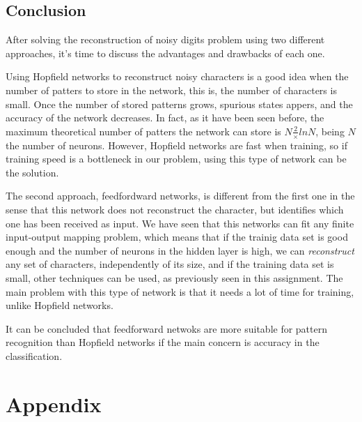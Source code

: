 \documentclass[10pt]{article}
\begin{document}
\begin{multicols}{2}
  \section*{Conclusion}
  After solving the reconstruction of noisy digits problem using two different approaches,
  it's time to discuss the advantages and drawbacks of each one.

  Using Hopfield networks to reconstruct noisy characters is a good idea when the number
  of patters to store in the network, this is, the number of characters is small. Once
  the number of stored patterns grows, spurious states appers, and the accuracy of the
  network decreases. In fact, as it have been seen before, the maximum theoretical number
  of patters the network can store is $N \frac 2\times ln N $, being $N$ the number of neurons.
  However, Hopfield networks are fast when training, so if training speed is a bottleneck in
  our problem, using this type of network can be the solution.

  The second approach, feedfordward networks, is different from the first one in the sense that
  this network does not reconstruct the character, but identifies which one has been received as
  input. We have seen that this networks can fit any finite input-output mapping problem, which
  means that if the trainig data set is good enough and the number of neurons in the hidden layer
  is high, we can \textit{reconstruct} any set of characters, independently of its size, and if
  the training data set is small, other techniques can be used, as previously seen in this assignment.
  The main problem with this type of network is that it needs a lot of time for training, unlike
  Hopfield networks.

  It can be concluded that feedforward netwoks are more suitable for pattern recognition than
  Hopfield networks if the main concern is accuracy in the classification.
  

\end{multicols}
\newpage

\section*{Appendix}
\end{document}
